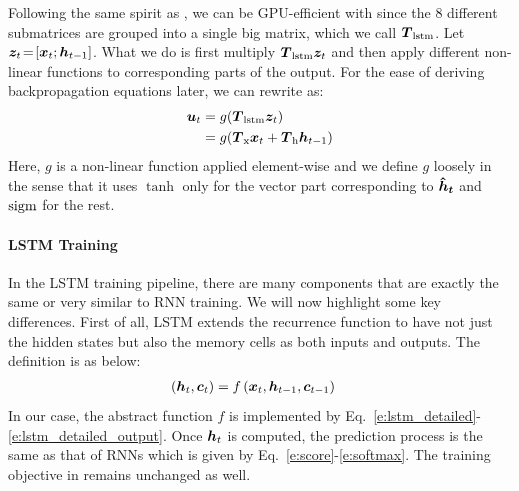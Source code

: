 Following the same spirit as , we can be GPU-efficient with
 since the 8 different submatrices are grouped into a single big matrix,
which we call $\mbox{\boldmath{$T$}}_{\text{lstm}}$. Let $\bm{z}_{t}\!=\![\bm{x}_{t}; \bm{h}_{t-1}]$. What we do is
first multiply $\mbox{\boldmath{$T$}}_{\text{lstm}} \bm{z}_{t}$ and then apply different non-linear functions to
corresponding parts of the output. For the ease of deriving backpropagation
equations later, we can rewrite  as:
\begin{align}
\bm{u}_t &= g(\mbox{\boldmath{$T$}}_{\text{lstm}} \bm{z}_{t}) \label{e:lstm_notation} \\
&= g(\mbox{\boldmath{$T$}}_{\text{x}}\bm{x}_{t} + \mbox{\boldmath{$T$}}_{\text{h}}\bm{h}_{t-1})
\label{e:lstm simplified}
\end{align}
Here, $g$ is a non-linear function applied element-wise and we define $g$ loosely in the sense that it uses $\tanh$ only for the vector part corresponding to $\mbox{\boldmath{$\hat{h}_t$}}$ and $\operatorname{sigm}$ for the rest.



\paragraph{LSTM Training}
In the LSTM training pipeline, there are many components that are exactly the
same or very similar to RNN training. We will now highlight some key
differences. First of all, LSTM extends the recurrence function to have not just
the hidden states but also the memory cells as both inputs and outputs. The
definition is as below:
\begin{align}
\left(\bm{h}_{t}, \bm{c}_{t}\right) &= f\left(\bm{x}_{t}, \bm{h}_{t-1}, \bm{c}_{t-1}\right)
\label{e:abstract_lstm}
\end{align}
In our case, the abstract function $f$ is implemented by
Eq.~\ref{e:lstm_detailed}-\ref{e:lstm_detailed_output}. Once $\bm{h}_{t}$ is
computed, the prediction process is the same as that of RNNs which is given by
Eq.~\ref{e:score}-\ref{e:softmax}. The training objective in 
remains unchanged as well.

